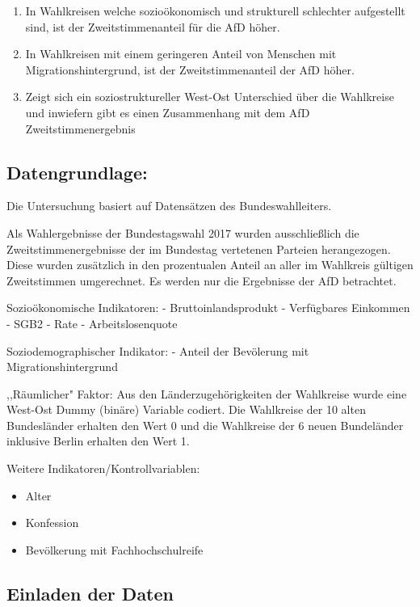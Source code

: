 \documentclass[11pt]{article}
\providecommand{\tightlist}{%
      \setlength{\itemsep}{0pt}\setlength{\parskip}{0pt}}
\begin{document}
    \begin{enumerate}
\def\labelenumi{\arabic{enumi}.}
\item
  In Wahlkreisen welche sozioökonomisch und strukturell schlechter
  aufgestellt sind, ist der Zweitstimmenanteil für die AfD höher.
\item
  In Wahlkreisen mit einem geringeren Anteil von Menschen mit
  Migrationshintergrund, ist der Zweitstimmenanteil der AfD höher.
\item
  Zeigt sich ein soziostruktureller West-Ost Unterschied über die
  Wahlkreise und inwiefern gibt es einen Zusammenhang mit dem AfD
  Zweitstimmenergebnis
\end{enumerate}

    \hypertarget{datengrundlage}{%
\subsection{Datengrundlage:}\label{datengrundlage}}

Die Untersuchung basiert auf Datensätzen des Bundeswahlleiters.

Als Wahlergebnisse der Bundestagswahl 2017 wurden ausschließlich die
Zweitstimmenergebnisse der im Bundestag vertetenen Parteien
herangezogen. Diese wurden zusätzlich in den prozentualen Anteil an
aller im Wahlkreis gültigen Zweitstimmen umgerechnet. Es werden nur die
Ergebnisse der AfD betrachtet.

Sozioökonomische Indikatoren: - Bruttoinlandsprodukt - Verfügbares
Einkommen - SGB2 - Rate - Arbeitslosenquote

Soziodemographischer Indikator: - Anteil der Bevölerung mit
Migrationshintergrund

,,Räumlicher" Faktor: Aus den Länderzugehörigkeiten der Wahlkreise wurde
eine West-Ost Dummy (binäre) Variable codiert. Die Wahlkreise der 10
alten Bundesländer erhalten den Wert 0 und die Wahlkreise der 6 neuen
Bundeländer inklusive Berlin erhalten den Wert 1.

Weitere Indikatoren/Kontrollvariablen:

\begin{itemize}
\tightlist
\item
  Alter
\item
  Konfession
\item
  Bevölkerung mit Fachhochschulreife
\end{itemize}

    \hypertarget{einladen-der-daten}{%
\subsection{Einladen der Daten}\label{einladen-der-daten}}
\end{document}
